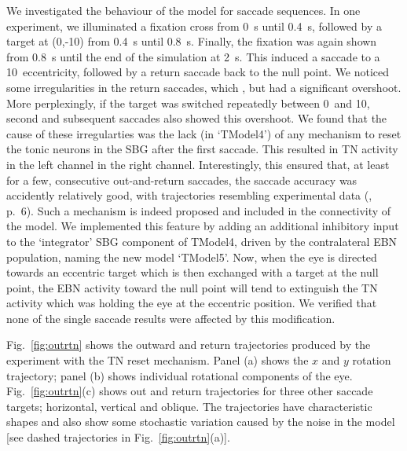\documentclass{frontiersSCNS}
\begin{document}
We investigated the behaviour of the model for saccade sequences.  In
one experiment, we illuminated a fixation cross from 0~s until 0.4~s,
followed by a target at (0,-10\dg) from 0.4~s until 0.8~s. Finally,
the fixation was again shown from 0.8~s until the end of the
simulation at 2~s. This induced a saccade to a 10\dg~eccentricity,
followed by a return saccade back to the null point. We noticed some
irregularities in the return saccades, which , but had a significant overshoot.  More perplexingly, if the
target was switched repeatedly between 0\dg~and 10\dg, second and
subsequent  saccades also showed this overshoot. We found
that the cause of these irregularties was the lack (in `TModel4') of
any mechanism to reset the tonic neurons in the SBG after the first
saccade. This resulted in TN activity in the left channel 
in the right channel. Interestingly, this ensured that, at least for a
few, consecutive out-and-return saccades, the saccade accuracy was
accidently relatively good, with trajectories resembling experimental data
(\cite{bahill_trajectories_1979}, p.~6).  Such a mechanism
is indeed proposed and included in the connectivity of the
\cite{gancarz_neural_1998} model. We implemented this feature by adding an
additional inhibitory input to the `integrator' SBG component of TModel4,
driven by the contralateral EBN population, naming the new model
`TModel5'.  Now, when the eye is directed towards an eccentric target
which is then exchanged with a target at the null point, the EBN
activity toward the null point will tend to extinguish the TN activity
which was holding the eye at the eccentric position.  We verified that
none of the single saccade results were affected by this modification.

Fig.~\ref{fig:outrtn} shows the outward and return trajectories produced
by the experiment with the TN reset mechanism. Panel (a) shows the $x$
and $y$ rotation trajectory; panel (b) shows individual rotational
components of the eye. Fig.~\ref{fig:outrtn}(c) shows out and return
trajectories for three other saccade targets; horizontal, vertical and
oblique. The trajectories have characteristic shapes and also show
some stochastic variation caused by the noise in the model [see dashed
trajectories in Fig.~\ref{fig:outrtn}(a)].
\end{document}
